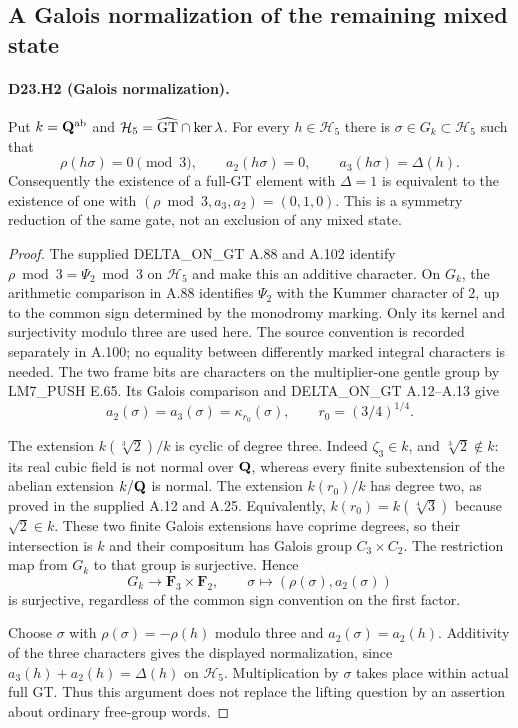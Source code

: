 \subsection{A Galois normalization of the remaining mixed state}

\paragraph{D23.H2 (Galois normalization).}
Put $k=\mathbf Q^{\mathrm{ab}}$ and $\mathcal H_5=\widehat{\mathrm{GT}}\cap\ker\lambda$.
For every $h\in\mathcal H_5$ there is
$\sigma\in G_k\subset\mathcal H_5$ such that
\[
 \rho(h\sigma)=0\pmod3,\qquad
 a_2(h\sigma)=0,\qquad a_3(h\sigma)=\Delta(h).
\]
Consequently the existence of a full-GT element with $\Delta=1$
is equivalent to the existence of one with
$(\rho\bmod3,a_3,a_2)=(0,1,0)$.
This is a symmetry reduction of the same gate, not an exclusion
of any mixed state.

\begin{proof}
The supplied DELTA\_ON\_GT A.88 and A.102 identify
$\rho\bmod3=\Psi_2\bmod3$ on $\mathcal H_5$ and make this
an additive character. On $G_k$, the arithmetic comparison
in A.88 identifies $\Psi_2$ with the Kummer character of $2$,
up to the common sign determined by the monodromy marking.
Only its kernel and surjectivity modulo three are used here.
The source convention is recorded separately in A.100;
no equality between differently marked integral characters is
needed. The two frame bits are characters on the multiplier-one
gentle group by LM7\_PUSH E.65. Its Galois comparison and
DELTA\_ON\_GT A.12--A.13 give
\[
 a_2(\sigma)=a_3(\sigma)=\kappa_{r_0}(\sigma),
 \qquad r_0=(3/4)^{1/4}.
\]

The extension $k(\sqrt[3]{2})/k$ is cyclic of degree three.
Indeed $\zeta_3\in k$, and $\sqrt[3]{2}\notin k$: its real
cubic field is not normal over $\mathbf Q$, whereas every finite
subextension of the abelian extension $k/\mathbf Q$ is normal.
The extension $k(r_0)/k$ has degree two, as proved in the
supplied A.12 and A.25. Equivalently,
$k(r_0)=k(\sqrt[4]{3})$ because $\sqrt2\in k$.
These two finite Galois extensions have coprime degrees,
so their intersection is $k$ and their compositum has Galois
group $C_3\times C_2$. The restriction map from $G_k$ to that
group is surjective. Hence
\[
 G_k\longrightarrow\mathbf F_3\times\mathbf F_2,
 \qquad \sigma\longmapsto(\rho(\sigma),a_2(\sigma))
\]
is surjective, regardless of the common sign convention on
the first factor.

Choose $\sigma$ with
$\rho(\sigma)=-\rho(h)$ modulo three and
$a_2(\sigma)=a_2(h)$. Additivity of the three characters gives
the displayed normalization, since
$a_3(h)+a_2(h)=\Delta(h)$ on $\mathcal H_5$.
Multiplication by $\sigma$ takes place within actual full GT.
Thus this argument does not replace the lifting question by
an assertion about ordinary free-group words.
\end{proof}
